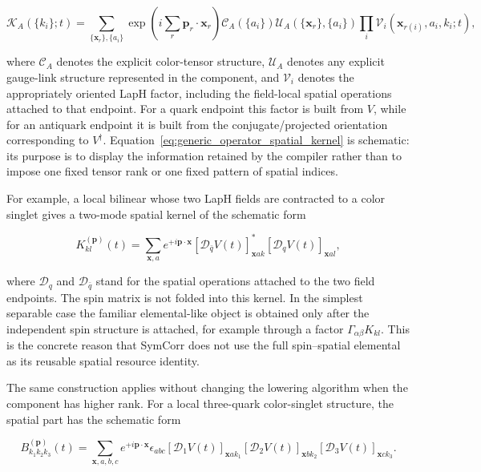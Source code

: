 \documentclass[11pt]{article}
\begin{document}
\begin{equation}
\mathcal K_A(\{k_i\};t)
=
\sum_{\{\mathbf x_r\},\{a_i\}}
\exp\!\left(
 i\sum_r \mathbf p_r\!\cdot\!\mathbf x_r
\right)
\mathcal C_A(\{a_i\})
\mathcal U_A(\{\mathbf x_r\},\{a_i\})
\prod_i
\mathcal V_i(\mathbf x_{r(i)},a_i,k_i;t),
\label{eq:generic_operator_spatial_kernel}
\end{equation}

where \(\mathcal C_A\) denotes the explicit color-tensor structure,
\(\mathcal U_A\) denotes any explicit gauge-link structure represented in the
component, and \(\mathcal V_i\) denotes the appropriately oriented LapH
factor, including the field-local spatial operations attached to that endpoint.
For a quark endpoint this factor is built from \(V\), while for an antiquark
endpoint it is built from the conjugate/projected orientation corresponding to
\(V^\dagger\). Equation~\eqref{eq:generic_operator_spatial_kernel} is schematic:
its purpose is to display the information retained by the compiler rather than
to impose one fixed tensor rank or one fixed pattern of spatial indices.

For example, a local bilinear whose two LapH fields are contracted to a color
singlet gives a two-mode spatial kernel of the schematic form

\begin{equation}
K_{kl}^{(\mathbf p)}(t)
=
\sum_{\mathbf x,a}
 e^{+i\mathbf p\cdot\mathbf x}
 \left[\mathcal D_{\bar q}V(t)\right]^*_{\mathbf x a k}
 \left[\mathcal D_q V(t)\right]_{\mathbf x a l},
\label{eq:bilinear_spatial_kernel}
\end{equation}

where \(\mathcal D_q\) and \(\mathcal D_{\bar q}\) stand for the spatial
operations attached to the two field endpoints. The spin matrix is not folded
into this kernel. In the simplest separable case the familiar elemental-like
object is obtained only after the independent spin structure is attached, for
example through a factor \(\Gamma_{\alpha\beta}K_{kl}\). This is the concrete
reason that SymCorr does not use the full spin--spatial elemental as its
reusable spatial resource identity.

The same construction applies without changing the lowering algorithm when the
component has higher rank. For a local three-quark color-singlet structure, the
spatial part has the schematic form

\begin{equation}
B_{k_1k_2k_3}^{(\mathbf p)}(t)
=
\sum_{\mathbf x,a,b,c}
 e^{+i\mathbf p\cdot\mathbf x}
 \epsilon_{abc}
 \left[\mathcal D_1 V(t)\right]_{\mathbf x a k_1}
 \left[\mathcal D_2 V(t)\right]_{\mathbf x b k_2}
 \left[\mathcal D_3 V(t)\right]_{\mathbf x c k_3}.
\label{eq:three_quark_spatial_kernel}
\end{equation}
\end{document}
